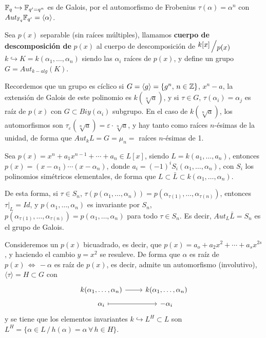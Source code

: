 \begin{ejem}
    $\mathbb{F}_q \hookrightarrow \mathbb{F}_{q'=q^n}$ es de Galois, por el automorfismo de Frobenius $\tau(\alpha) = \alpha^n$ con $Aut_{\mathbb{F}_q} \mathbb{F}_{q'} = \langle \alpha \rangle$. 
\end{ejem}
\begin{defi}
    Sea $p(x)$ separable (sin ra\'ices m\'ultiples), llamamos \textbf{cuerpo de descomposici\'on de }$p(x)$ al cuerpo de descomposici\'on de $\modulo{k[x]}{p(x)}$ $k \hookrightarrow K = k(\alpha_1, \ldots, \alpha_n)$ siendo las $\alpha_i$ ra\'ices de $p(x)$, y define un grupo $G = Aut_{k-alg}(K)$. 
\end{defi}
\begin{obs}
    Recordemos que un grupo es c\'iclico si $G = \langle g\rangle = \{g^n , \, n \in \mathbb{Z}\}$, $x^n-a$, la extensi\'on de Galois de este polinomio es $k(\sqrt[n]{a})$, y si $\tau \in G$, $\tau(\alpha_i) = \alpha_j$ es ra\'iz de $p(x)$ con $G \subset Biy(\alpha_i)$ subgrupo. En el caso de $k(\sqrt[n]{a})$, los automorfismos son $\tau_{\varepsilon}(\sqrt[n]{a}) = \varepsilon \cdot \sqrt[n]{a}$, y hay tanto como ra\'ices $n$-\'esimas de la unidad, de forma que $Aut_k L = G = \mu_n = $ ra\'ices $n$-\'esimas de 1. 
\end{obs}
\begin{custom}
     Sea $p(x) = x^n + a_1 x^{n-1} + \cdots + a_n \in L[x]$, siendo $L = k(a_1, \ldots, a_n)$, entonces $p(x)=(x-\alpha_1) \cdots (x-\alpha_n)$, donde $a_i = (-1)^i S_i(\alpha_1, \ldots, \alpha_n)$, con $S_i$ los polinomios sim\'etricos elementales, de forma que $L \subset \bar L \subset k(\alpha_1, \ldots, \alpha_n)$. 
    
    De esta forma, si $\tau \in S_n$, $\tau(p(\alpha_1, \ldots, \alpha_n))=p(\alpha_{\tau(1)}, \ldots, \alpha_{\tau(n)})$, entonces $\tau|_L = Id$, y $p(\alpha_1, \ldots, \alpha_n)$ es invariante por $S_n$, $p(\alpha_{\tau(1)}, \ldots, \alpha_{\tau(n)}) = p(\alpha_1, \ldots, \alpha_n)$ para todo $\tau \in S_n$. Es decir, $Aut_{L} \bar L = S_n$ es el grupo de Galois. 
\end{custom}
\begin{ejem}
    Consideremos un $p(x)$ bicuadrado, es decir, que $p(x) = a_o + a_2 x^2+ \cdots +a_s x^{2s}$, y haciendo el cambio $y=x^2$ se resuleve. De forma que $\alpha$ es ra\'iz de $p(x) \, \iff \, -\alpha$ es ra\'iz de $p(x)$, es decir, admite un automorfismo (involutivo), $\langle \tau \rangle = H \subset G$ con 
    $$\bt k(\alpha_1, \ldots, \alpha_n)\rar & k(\alpha_1, \ldots, \alpha_n)\\[-5mm] \alpha_i \rarmaps & -\alpha_i  \et$$
    y se tiene que los elementos invariantes $k \hookrightarrow L^H \subset L$ son $L^H = \{\alpha \in L \, / \, h(\alpha) = \alpha\, \forall \, h\in H\}$. 
\end{ejem}
